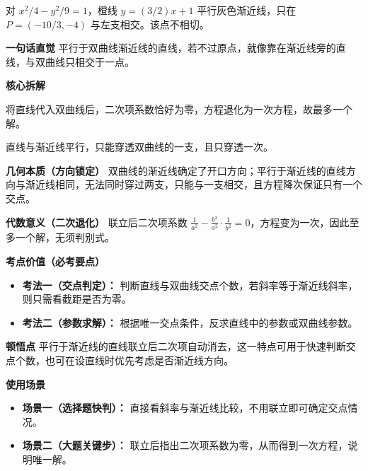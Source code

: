 \begin{explanationbox}
\begin{minipage}{\linewidth}
\begin{center}\end{center}
对 $x^2/4-y^2/9=1$，橙线 $y=(3/2)x+1$ 平行灰色渐近线，只在 $P=(-10/3,-4)$ 与左支相交。该点不相切。
\end{minipage}
\par\medskip

	\textbf{\textcolor{CExplanation}{一句话直觉}}
	平行于双曲线渐近线的直线，若不过原点，就像靠在渐近线旁的直线，与双曲线只相交于一点。

	\medskip
	\textbf{\textcolor{CExplanation}{核心拆解}}
	\begin{description}[style=nextline, leftmargin=2.8em, labelsep=0.5em, itemsep=0.45em]
		\item[\textbf{要点一（代数本质）：}]
			将直线代入双曲线后，二次项系数恰好为零，方程退化为一次方程，故最多一个解。
		\item[\textbf{要点二（几何视角）：}]
			直线与渐近线平行，只能穿透双曲线的一支，且只穿透一次。
	\end{description}

	\medskip
	\textbf{\textcolor{CExplanation}{几何本质（方向锁定）}}
	双曲线的渐近线确定了开口方向；平行于渐近线的直线方向与渐近线相同，无法同时穿过两支，只能与一支相交，且方程降次保证只有一个交点。

	\medskip
	\textbf{\textcolor{CExplanation}{代数意义（二次退化）}}
	联立后二次项系数 $\frac{1}{a^2} - \frac{b^2}{a^2}\cdot\frac{1}{b^2}=0$，方程变为一次，因此至多一个解，无须判别式。

	\medskip
	\textbf{\textcolor{CExplanation}{考点价值（必考要点）}}
	\begin{itemize}[leftmargin=*, itemsep=0.5em, topsep=0.4em]
		\item \textbf{考法一（交点判定）：} 判断直线与双曲线交点个数，若斜率等于渐近线斜率，则只需看截距是否为零。
		\item \textbf{考法二（参数求解）：} 根据唯一交点条件，反求直线中的参数或双曲线参数。
	\end{itemize}

	\medskip
	\textbf{\textcolor{CExplanation}{顿悟点}}
	平行于渐近线的直线联立后二次项自动消去，这一特点可用于快速判断交点个数，也可在设直线时优先考虑是否渐近线方向。

	\medskip
	\textbf{\textcolor{CExplanation}{使用场景}}
	\begin{itemize}[leftmargin=*, itemsep=0.5em, topsep=0.4em]
		\item \textbf{场景一（选择题快判）：} 直接看斜率与渐近线比较，不用联立即可确定交点情况。
		\item \textbf{场景二（大题关键步）：} 联立后指出二次项系数为零，从而得到一次方程，说明唯一解。
	\end{itemize}

\end{explanationbox}
